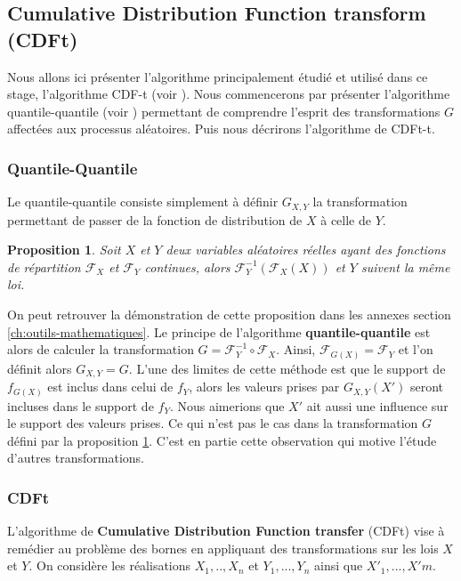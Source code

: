 \documentclass[a4paper,11pt]{article}
\numberwithin{equation}{section}
\newtheorem{proposition}{Proposition}
\begin{document}
\subsection{Cumulative Distribution Function transform (CDFt)}
\label{ch:CDFt}

Nous allons ici présenter l'algorithme principalement étudié et utilisé dans ce stage, l'algorithme CDF-t (voir \cite{vrac2012dynamical}). Nous commencerons par présenter l'algorithme quantile-quantile (voir ) permettant de comprendre l'esprit des transformations $G$ affectées aux processus aléatoires. Puis nous décrirons l'algorithme de CDFt-t. 

\subsubsection{Quantile-Quantile}
\label{Q-Q}
Le quantile-quantile consiste simplement à définir $G_{X,Y}$ la transformation permettant de passer de la fonction de distribution de $X$ à celle de $Y$. 
\begin{proposition}
	\label{prop:QQ_formula}
	Soit $X$ et $Y$ deux variables aléatoires réelles ayant des fonctions de répartition $\mathcal{F}_{X}$ et $\mathcal{F}_{Y}$ continues, alors 
	$\mathcal{F}^{-1}_Y (\mathcal{F}_X(X))$ et $Y$ suivent la même loi. 
\end{proposition}
On peut retrouver la démonstration de cette proposition dans les annexes section \ref{ch:outils-mathematiques}. Le principe de l'algorithme \textbf{quantile-quantile} est alors de calculer la transformation $G=\mathcal{F}^{-1}_{Y} \circ \mathcal{F}_{X}$. Ainsi, $\mathcal{F}_{G(X)}=\mathcal{F}_{Y}$ et l'on définit alors $G_{X,Y}=G$. L'une des limites de cette méthode est que le support de $f_{G(X)}$ est inclus dans celui de $f_{Y}$, alors les valeurs prises par $G_{X,Y}(X')$ seront incluses dans le support de $f_Y$. Nous aimerions que $X'$ ait aussi une influence sur le support des valeurs prises. Ce qui n'est pas le cas dans la transformation $G$ défini par la proposition \ref{prop:QQ_formula}. C'est en partie cette observation qui motive l'étude d'autres transformations. 

\subsubsection{CDFt}
\label{CDf-t-algo}

L'algorithme de \textbf{Cumulative Distribution Function transfer} (CDFt) vise à remédier au problème des bornes en appliquant des transformations sur les lois $X$ et $Y$. On considère les réalisations $X_1,..,X_n$ et $Y_1,...,Y_n$ ainsi que $X'_{1},...,X'{m}$.
\end{document}
